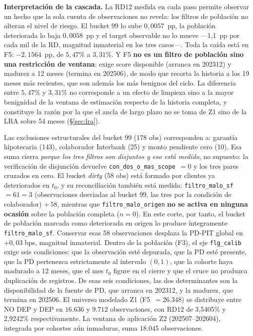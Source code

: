 \documentclass[12pt, a4paper]{article}
\newcommand{\LRA}{\ensuremath{\mathrm{LRA}}}
\begin{document}
\noindent\textbf{Interpretación de la cascada.} La RD12 medida en cada paso permite observar un hecho que la
sola cuenta de observaciones no revela: los filtros de población no alteran el nivel de riesgo. El
bucket 99 lo sube $0{,}0057$~pp, la población deteriorada lo baja $0{,}0058$~pp y el target observable no lo
mueve ---1{,}1~pp por cada mil de la RD, magnitud inmaterial en los tres casos---. Toda la caída está en
F5: $-2{,}1564$~pp, de $5{,}47\%$ a $3{,}31\%$. Y F5 \textbf{no es un filtro de población sino una
restricción de ventana}: exige score disponible (arranca en 202312) y madurez a 12 meses (termina
en 202506), de modo que recorta la historia a los 19 meses más recientes, que son además los más
benignos del ciclo. La diferencia entre $5{,}47\%$ y $3{,}31\%$ no corresponde a un efecto de limpieza sino a
la mayor benignidad de la ventana de estimación respecto de la historia completa, y constituye la razón por
la que el ancla de largo plazo no se toma de Z1 sino de la \LRA{} sobre 54 meses
(\S\ref{sec:lra}).

\noindent Las exclusiones estructurales del bucket 99 (178 obs) corresponden a: garantía
hipotecaria (143), colaborador Interbank (25) y monto pendiente cero (10). Esa suma cierra
\emph{porque los tres filtros son disjuntos y eso está medido}, no supuesto: la verificación de disjunción
devuelve \texttt{con\_dos\_o\_mas\_scope}~$=0$ y los tres pares cruzados en cero. El bucket
\emph{dirty} (58 obs) está formado por clientes ya deteriorados en $t_0$, y su reconciliación
también está medida: \texttt{filtro\_malo\_sf}~$=61=3$ (observaciones desviadas al bucket 99, las
tres por la condición de colaborador) $+\,58$, mientras que \texttt{filtro\_malo\_origen}
\textbf{no se activa en ninguna ocasión} sobre la población completa ($n=0$). En este corte, por
tanto, el bucket de población marcada como deteriorada en origen lo produce íntegramente
\texttt{filtro\_malo\_sf}. Conservar esas 58 observaciones desplaza la PD-PIT global en
$+0{,}03$ bps, magnitud inmaterial. Dentro de la
población (F3), el eje \texttt{flg\_calib} exige seis condiciones: que la observación esté
depurada, que la PD esté presente, que la PD pertenezca estrictamente al intervalo $(0,1)$, que la
cohorte haya madurado a 12 meses, que el mes $t_0$ figure en el cierre y que el cruce no produzca
duplicación de registros. De esas seis condiciones, las dos determinantes son la disponibilidad de
la fuente de PD, que arranca en 202312, y la madurez, que termina en 202506. El universo modelado
Z1 (F5~$=26.348$) se distribuye entre NO DEP y DEP en $16.636$ y $9.712$ observaciones, con RD12
de 3,5405\% y 2,9242\% respectivamente. La ventana de aplicación Z2 (202507--202604), integrada
por cohortes aún inmaduras, suma 18.045 observaciones.
\end{document}
